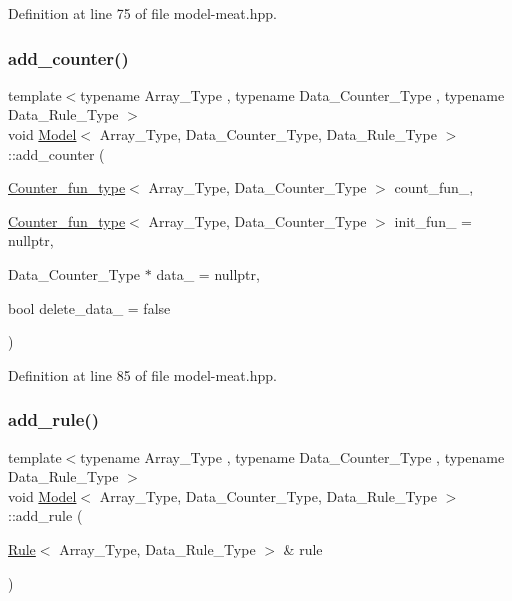 Definition at line 75 of file model-\/meat.\+hpp.

\mbox{\label{class_model_a4e4a18943bda513a844dc11aa088a698}} 
\subsubsection{\texorpdfstring{add\+\_\+counter()}{add\_counter()}\hspace{0.1cm}{\footnotesize\ttfamily [3/3]}}
{\footnotesize\ttfamily template$<$typename Array\+\_\+\+Type , typename Data\+\_\+\+Counter\+\_\+\+Type , typename Data\+\_\+\+Rule\+\_\+\+Type $>$ \\
void \hyperlink{class_model}{Model}$<$ Array\+\_\+\+Type, Data\+\_\+\+Counter\+\_\+\+Type, Data\+\_\+\+Rule\+\_\+\+Type $>$\+::add\+\_\+counter (\begin{DoxyParamCaption}\item[{\hyperlink{typedefs_8hpp_ac0160f52f564dea3ac033b374cffbfe7}{Counter\+\_\+fun\+\_\+type}$<$ Array\+\_\+\+Type, Data\+\_\+\+Counter\+\_\+\+Type $>$}]{count\+\_\+fun\+\_\+,  }\item[{\hyperlink{typedefs_8hpp_ac0160f52f564dea3ac033b374cffbfe7}{Counter\+\_\+fun\+\_\+type}$<$ Array\+\_\+\+Type, Data\+\_\+\+Counter\+\_\+\+Type $>$}]{init\+\_\+fun\+\_\+ = {\ttfamily nullptr},  }\item[{Data\+\_\+\+Counter\+\_\+\+Type $\ast$}]{data\+\_\+ = {\ttfamily nullptr},  }\item[{bool}]{delete\+\_\+data\+\_\+ = {\ttfamily false} }\end{DoxyParamCaption})\hspace{0.3cm}{\ttfamily [inline]}}



Definition at line 85 of file model-\/meat.\+hpp.

\mbox{\label{class_model_af2c3f6300b90e6a2a4deaebaf2b0e732}} 
\subsubsection{\texorpdfstring{add\+\_\+rule()}{add\_rule()}\hspace{0.1cm}{\footnotesize\ttfamily [1/3]}}
{\footnotesize\ttfamily template$<$typename Array\+\_\+\+Type , typename Data\+\_\+\+Counter\+\_\+\+Type , typename Data\+\_\+\+Rule\+\_\+\+Type $>$ \\
void \hyperlink{class_model}{Model}$<$ Array\+\_\+\+Type, Data\+\_\+\+Counter\+\_\+\+Type, Data\+\_\+\+Rule\+\_\+\+Type $>$\+::add\+\_\+rule (\begin{DoxyParamCaption}\item[{\hyperlink{class_rule}{Rule}$<$ Array\+\_\+\+Type, Data\+\_\+\+Rule\+\_\+\+Type $>$ \&}]{rule }\end{DoxyParamCaption})\hspace{0.3cm}{\ttfamily [inline]}}



